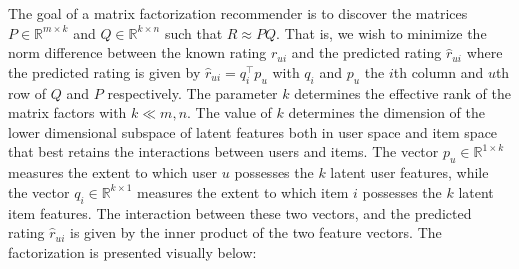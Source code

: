 \documentclass{article} %
\begin{document}
The goal of a matrix factorization recommender is to discover the matrices $P \in \mathbb{R}^{m \times k}$ and $Q \in \mathbb{R}^{k \times n}$ such that $R \approx PQ$. That is, we wish to minimize the norm difference between the known rating $r_{ui}$ and the predicted rating $\hat r_{ui}$ where the predicted rating is given by $\hat r_{ui} = q_i^\intercal p_u$ with $q_i$ and $p_u$ the $i$th column and $u$th row of $Q$ and $P$ respectively. The parameter $k$ determines the effective rank of the matrix factors with $k \ll m,n$. The value of $k$ determines the dimension of the lower dimensional subspace of latent features both in user space and item space that best retains the interactions between users and items. The vector $p_u \in \mathbb{R}^{1 \times k}$ measures the extent to which user $u$ possesses the $k$ latent user features, while the vector $q_i \in \mathbb{R}^{k \times 1}$ measures the extent to which item $i$ possesses the $k$ latent item features. The interaction between these two vectors, and the predicted rating $\hat r_{ui}$ is given by the inner product of the two feature vectors. The factorization is presented visually below:
\end{document}
